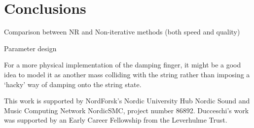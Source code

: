 \documentclass[dvipsnames, pdftex]{article}
\begin{document}
\section{Conclusions}
Comparison between NR and Non-iterative methods (both speed and quality)

Parameter design



For a more physical implementation of the damping finger, it might be a good idea to model it as another mass colliding with the string rather than imposing a `hacky' way of damping onto the string state. 
\begin{acknowledgments}
This work is supported by NordForsk's Nordic
University Hub Nordic Sound and Music Computing Network
NordicSMC, project number 86892. Ducceschi's work was supported by an Early Career Fellowship from the Leverhulme Trust.
\end{acknowledgments} 

{\small

}
\end{document}

